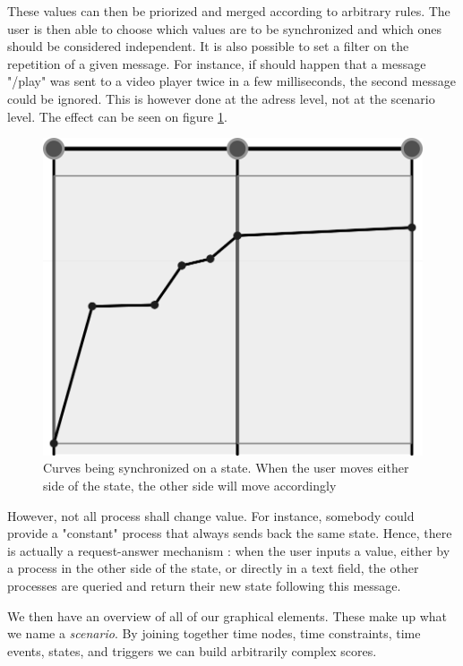 \documentclass{sigchi}
\begin{document}
These values can then be priorized and merged according to arbitrary rules. The user is then able to choose which values are to be synchronized and which ones should be considered independent.
It is also possible to set a filter on the repetition of a given message. For instance, if should happen that a message "/play" was sent to a video player twice in a few milliseconds, the second message could be ignored. This is however done at the adress level, not at the scenario level. The effect can be seen on figure \ref{fig.curvesync}. %

\begin{figure}
	\centering
	\includegraphics[scale=0.2]{images/curvesync.png}
	\caption{Curves being synchronized on a state. When the user moves either side of the state, the other side will move accordingly}
	\label{fig.curvesync}
\end{figure}

However, not all process shall change value. For instance, somebody could provide a "constant" process that always sends back the same state. Hence, there is actually a request-answer mechanism : when the user inputs a value, either by a process in the other side of the state, or directly in a text field, the other processes are queried and return their new state following this message.

We then have an overview of all of our graphical elements. These make up what we name a \textit{scenario}. By joining together time nodes, time constraints, time events, states, and triggers we can build arbitrarily complex scores. 
\end{document}
